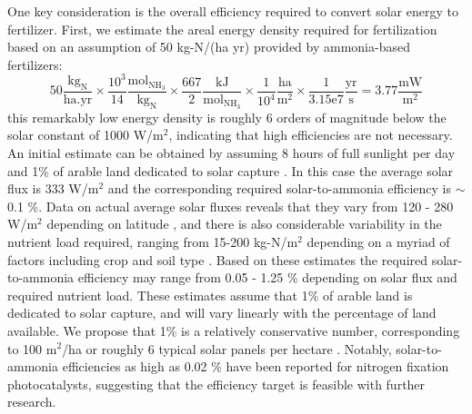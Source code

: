One key consideration is the overall efficiency required to convert solar energy to fertilizer. First, we estimate the areal energy density required for fertilization based on an assumption of 50 kg-N/(ha yr) provided by ammonia-based fertilizers:
\begin{equation}
\mathrm{
50 \frac{kg_N}{ha . yr} \times \frac{10^3}{14} \frac{mol_{NH_3}}{kg_N} \times \frac{667}{2} \frac{kJ}{mol_{NH_3}} \times \frac{1}{10^4} \frac{ha}{m^2} \times \frac{1}{3.15e7} \frac{yr}{s} = 3.77 \frac{mW}{m^2}
}
\end{equation}
this remarkably low energy density is roughly 6 orders of magnitude below the solar constant of 1000 W/m$^2$, indicating that high efficiencies are not necessary. An initial estimate can be obtained by assuming 8 hours of full sunlight per day and 1\% of arable land dedicated to solar capture \cite{Medford_2017}. In this case the average solar flux is 333 W/m$^2$ and the corresponding required solar-to-ammonia efficiency is $\sim$0.1 \%. Data on actual average solar fluxes reveals that they vary from 120 - 280 W/m$^2$ depending on latitude \cite{MacKay_2013}, and there is also considerable variability in the nutrient load required, ranging from 15-200 kg-N/m$^2$ depending on a myriad of factors including crop and soil type \needcite. Based on these estimates the required solar-to-ammonia efficiency may range from 0.05 - 1.25 \% depending on solar flux and required nutrient load. These estimates assume that 1\% of arable land is dedicated to solar capture, and will vary linearly with the percentage of land available. We propose that 1\% is a relatively conservative number, corresponding to 100 m$^2$/ha or roughly 6 typical solar panels per hectare \needcite. Notably, solar-to-ammonia efficiencies as high as 0.02 \% have been reported for nitrogen fixation photocatalysts, suggesting that the efficiency target is feasible with further research.

